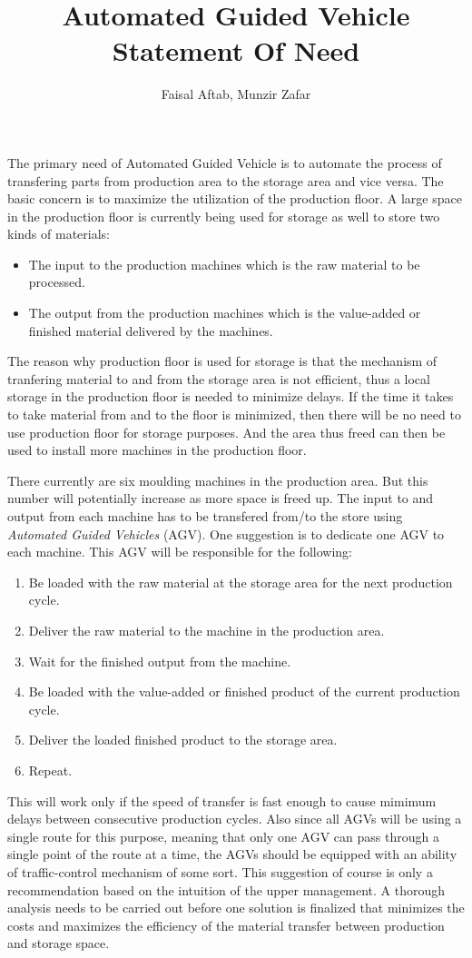 \documentclass[11pt]{article} %
\title{Automated Guided Vehicle\\Statement Of Need}
\author{Faisal Aftab, Munzir Zafar}
\begin{document}
\maketitle
The primary need of Automated Guided Vehicle is to automate the process of transfering parts from production area to the storage area and vice versa. The basic concern is to maximize the utilization of the production floor. A large space in the production floor is currently being used for storage as well to store two kinds of materials: 
\begin{itemize}
 \item The input to the production machines which is the raw material to be processed.
 \item The output from the production machines which is the value-added or finished material delivered by the machines.
\end{itemize}
The reason why production floor is used for storage is that the mechanism of tranfering material to and from the storage area is not efficient, thus a local storage in the production floor is needed to minimize delays. If the time it takes to take material from and to the floor is minimized, then there will be no need to use production floor for storage purposes. And the area thus freed can then be used to install more machines in the production floor.

There currently are six moulding machines in the production area. But this number will potentially increase as more space is freed up. The input to and output from each machine has to be transfered from/to the store using \emph{Automated Guided Vehicles} (AGV). One suggestion is to dedicate one AGV to each machine. This AGV will be responsible for the following:
\begin{enumerate}
 \item Be loaded with the raw material at the storage area for the next production cycle.
 \item Deliver the raw material to the machine in the production area.
 \item Wait for the finished output from the machine.
 \item Be loaded with the value-added or finished product of the current production cycle.
 \item Deliver the loaded finished product to the storage area.
 \item Repeat.
\end{enumerate}
This will work only if the speed of transfer is fast enough to cause mimimum delays between consecutive production cycles.
Also since all AGVs will be using a single route for this purpose, meaning that only one AGV can pass through a single point of the route at a time, the AGVs should be equipped with an ability of traffic-control mechanism of some sort. 
This suggestion of course is only a recommendation based on the intuition of the upper management. A thorough analysis needs to be carried out before one solution is finalized that minimizes the costs and maximizes the efficiency of the material transfer between production and storage space.
\end{document}

